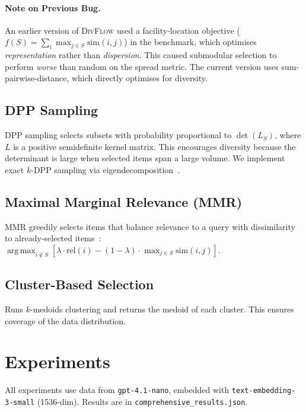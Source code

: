 \documentclass[11pt]{article}
\DeclareMathOperator*{\argmax}{arg\,max}
\begin{document}
\paragraph{Note on Previous Bug.}
An earlier version of \textsc{DivFlow} used a facility-location
objective ($f(S) = \sum_i \max_{j \in S} \text{sim}(i,j)$) in the
benchmark, which optimises \emph{representation} rather than
\emph{dispersion}. This caused submodular selection to perform
\emph{worse} than random on the spread metric. The current version
uses sum-pairwise-distance, which directly optimises for diversity.

\subsection{DPP Sampling}

DPP sampling selects subsets with probability proportional to
$\det(L_S)$, where $L$ is a positive semidefinite kernel matrix.
This encourages diversity because the determinant is large when
selected items span a large volume. We implement exact $k$-DPP
sampling via eigendecomposition~\citep{kulesza2012determinantal}.

\subsection{Maximal Marginal Relevance (MMR)}

MMR greedily selects items that balance relevance to a query with
dissimilarity to already-selected items~\citep{carbonell1998mmr}:
$\argmax_{i \notin S} [\lambda \cdot \text{rel}(i) - (1-\lambda) \cdot \max_{j \in S} \text{sim}(i,j)]$.

\subsection{Cluster-Based Selection}

Runs $k$-medoids clustering and returns the medoid of each cluster.
This ensures coverage of the data distribution.

\section{Experiments}
\label{sec:experiments}

All experiments use data from \texttt{gpt-4.1-nano},
embedded with \texttt{text-embedding-3-small} (1536-dim).
Results are in \texttt{comprehensive\_results.json}.
\end{document}
